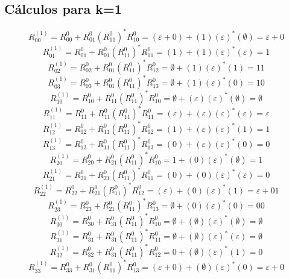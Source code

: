 \documentclass[11pt]{article}
\begin{document}
		\subsection{Cálculos para k=1}
			\[R_{00}^{(1)}=R_{00}^{0}+R_{01}^{0}{(R_{11}^{0})}^\ast R_{10}^{0}=(\varepsilon+0)+(1)(\varepsilon)^\ast(\emptyset)=\varepsilon+0\]
			\[R_{01}^{(1)}=R_{01}^{0}+R_{01}^{0}{(R_{11}^{0})}^\ast R_{11}^{0}=(1)+(1)(\varepsilon)^\ast(\varepsilon)=1\]
			\[R_{02}^{(1)}=R_{02}^{0}+R_{01}^{0}{(R_{11}^{0})}^\ast R_{12}^{0}=\emptyset+(1)(\varepsilon)^\ast(1)=11\]
			\[R_{03}^{(1)}=R_{03}^{0}+R_{01}^{0}{(R_{11}^{0})}^\ast R_{13}^{0}=\emptyset+(1)(\varepsilon)^\ast(0)=10\]
			\[R_{10}^{(1)}=R_{10}^{0}+R_{11}^{0}{(R_{11}^{0})}^\ast R_{10}^{0}=\emptyset+(\varepsilon)(\varepsilon)^\ast(\emptyset)=\emptyset\]
			\[R_{11}^{(1)}=R_{11}^{0}+R_{11}^{0}{(R_{11}^{0})}^\ast R_{11}^{0}=(\varepsilon)+(\varepsilon)(\varepsilon)^\ast(\varepsilon)=\varepsilon\]
			\[R_{12}^{(1)}=R_{12}^{0}+R_{11}^{0}{(R_{11}^{0})}^\ast R_{12}^{0}=(1)+(\varepsilon)(\varepsilon)^\ast(1)=1\]
			\[R_{13}^{(1)}=R_{13}^{0}+R_{11}^{0}{(R_{11}^{0})}^\ast R_{13}^{0}=(0)+(\varepsilon)(\varepsilon)^\ast(0)=0\]
			\[R_{20}^{(1)}=R_{20}^{0}+R_{21}^{0}{(R_{11}^{0})}^\ast R_{10}^{0}=1+(0)(\varepsilon)^\ast(\emptyset)=1\]
			\[R_{21}^{(1)}=R_{21}^{0}+R_{21}^{0}{(R_{11}^{0})}^\ast R_{11}^{0}=(0)+(0)(\varepsilon)^\ast(\varepsilon)=0\]
			\[R_{22}^{(1)}=R_{22}^{0}+R_{21}^{0}{(R_{11}^{0})}^\ast R_{12}^{0}=(\varepsilon)+(0)(\varepsilon)^\ast(1)=\varepsilon+01\]
			\[R_{23}^{(1)}=R_{23}^{0}+R_{21}^{0}{(R_{11}^{0})}^\ast R_{13}^{0}=\emptyset+(0)(\varepsilon)^\ast(0)=00\]
			\[R_{30}^{(1)}=R_{30}^{0}+R_{31}^{0}{(R_{11}^{0})}^\ast R_{10}^{0}=\emptyset+(\emptyset)(\varepsilon)^\ast(\emptyset)=\emptyset\]
			\[R_{31}^{(1)}=R_{31}^{0}+R_{31}^{0}{(R_{11}^{0})}^\ast R_{11}^{0}=\emptyset+(\emptyset)(\varepsilon)^\ast(\varepsilon)=\emptyset\]
			\[R_{32}^{(1)}=R_{32}^{0}+R_{31}^{0}{(R_{11}^{0})}^\ast R_{12}^{0}=0+(\emptyset)(\varepsilon)^\ast(1)=0\]
			\[R_{33}^{(1)}=R_{33}^{0}+R_{31}^{0}{(R_{11}^{0})}^\ast R_{13}^{0}=(\varepsilon+0)+(\emptyset)(\varepsilon)^\ast(0)=\varepsilon+0\]
\end{document}
